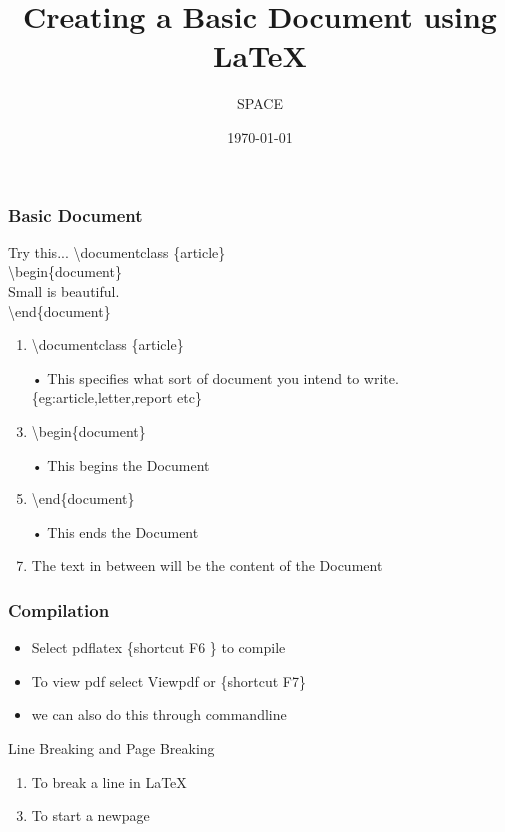 \documentclass{beamer}
\title{Creating a Basic Document using \LaTeX}
\author{SPACE}
\date{\today}
\begin{document}
\maketitle

\begin{frame}
\frametitle{Basic Document}
\begin{block}{Try this...}
\textbackslash documentclass \{article\} \\
\textbackslash begin\{document\}\\
Small is beautiful.\\
\textbackslash end\{document\}
\end{block}
\begin{enumerate}
\item \textbackslash documentclass \{article\}
\item[•] This specifies what sort of document you intend to write.\{eg:article,letter,report etc\}
\item \textbackslash begin\{document\} 
\item[•] This begins the Document
\item \textbackslash end\{document\} 
\item[•] This ends the Document
\item The text in between will be the content of the Document
\end{enumerate}
\end{frame}

\begin{frame}
\frametitle{Compilation}
\begin{itemize}
\item Select pdflatex \{shortcut F6 \} to compile
\item To view pdf select Viewpdf or \{shortcut F7\}
\item we can also do this through commandline
\end{itemize}
\end{frame}

\begin{frame}{Line Breaking and Page Breaking}
\begin{enumerate}
\item To break a line in \LaTeX
\item[]
\item To start a newpage
\item[] 
\end{enumerate}
\end{frame}
\end{document}
